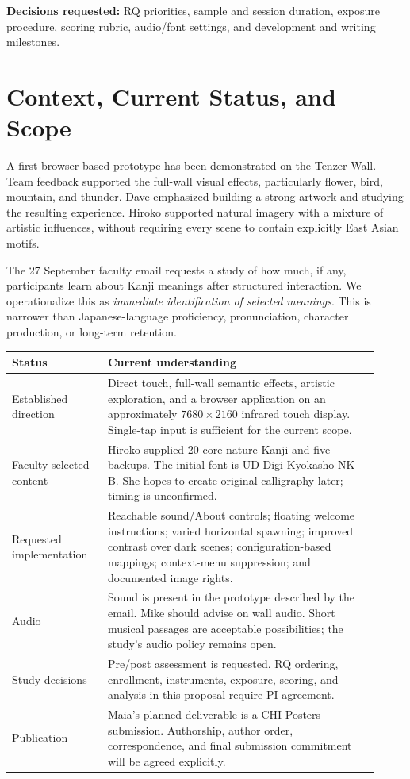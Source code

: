 \documentclass[11pt,letterpaper]{article}
\begin{document}
\textbf{Decisions requested:} RQ priorities, sample and session duration, exposure procedure, scoring rubric, audio/font settings, and development and writing milestones.
\tableofcontents
\newpage

\section{Context, Current Status, and Scope}
A first browser-based prototype has been demonstrated on the Tenzer Wall. Team feedback supported the full-wall visual effects, particularly flower, bird, mountain, and thunder. Dave emphasized building a strong artwork and studying the resulting experience. Hiroko supported natural imagery with a mixture of artistic influences, without requiring every scene to contain explicitly East Asian motifs.

The 27 September faculty email requests a study of how much, if any, participants learn about Kanji meanings after structured interaction. We operationalize this as \emph{immediate identification of selected meanings}. This is narrower than Japanese-language proficiency, pronunciation, character production, or long-term retention.

\begin{longtable}{p{0.24\linewidth}p{0.68\linewidth}}
\toprule Status & Current understanding \\
\midrule\endhead
Established direction & Direct touch, full-wall semantic effects, artistic exploration, and a browser application on an approximately $7680\times2160$ infrared touch display. Single-tap input is sufficient for the current scope. \\
Faculty-selected content & Hiroko supplied 20 core nature Kanji and five backups. The initial font is UD Digi Kyokasho NK-B. She hopes to create original calligraphy later; timing is unconfirmed. \\
Requested implementation & Reachable sound/About controls; floating welcome instructions; varied horizontal spawning; improved contrast over dark scenes; configuration-based mappings; context-menu suppression; and documented image rights. \\
Audio & Sound is present in the prototype described by the email. Mike should advise on wall audio. Short musical passages are acceptable possibilities; the study's audio policy remains open. \\
Study decisions & Pre/post assessment is requested. RQ ordering, enrollment, instruments, exposure, scoring, and analysis in this proposal require PI agreement. \\
Publication & Maia's planned deliverable is a CHI Posters submission. Authorship, author order, correspondence, and final submission commitment will be agreed explicitly. \\
\bottomrule
\end{longtable}
\end{document}
